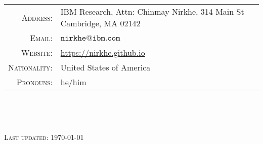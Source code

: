 \documentclass[11pt]{article}
\begin{document}
\begin{tabular}{rl}
    \textsc{Address:}     & IBM Research, Attn: Chinmay Nirkhe, 314 Main St Cambridge, MA 02142 \\
    \textsc{Email:}       & $\mathtt{nirkhe@ibm.com}$ \\
    \textsc{Website:}     & \url{https://nirkhe.github.io} \\
    \textsc{Nationality:} & United States of America \\
    \textsc{Pronouns:}    & he/him \\
\end{tabular}

\

\

\textsc{Last updated: \today}
\end{document}
